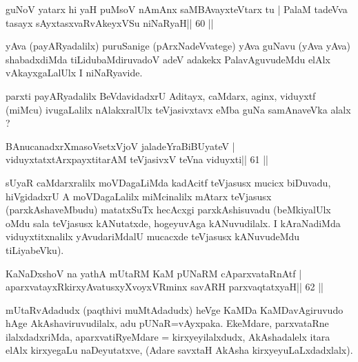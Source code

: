\begin{shl}
guNoV yatarx hi yaH puMsoV nAmAnx saMBAvayxteV\s tarx tu |
PalaM tadeVva tasayx sAyxtasxvaRvAkeyxVSu niNaRyaH\hfill || 60 ||
\end{shl}

\begin{artha}
yAva (payARyadalilx) puruSanige (pArxNadeVvatege) yAva guNavu (yAva yAva) shabadxdiMda tiLidubaMdiruvadoV adeV adakekx PalavAguvudeMdu elAlx vAkayxgaLalUlx I niNaRyavide.
\end{artha}

\begin{artha}
parxti payARyadalilx BeVdavidadxrU Aditayx, caMdarx, aginx, viduyxtf (miMcu) ivugaLalilx nAlakxralUlx teVjasivxtavx eMba guNa samAnaveVka alalx ?
\end{artha}


\begin{shl}
BAnucanadxrXmasoVsetxVjoV jaladeYraBiBUyateV |
viduyxtatxtArxpayxtitarAM teVjasivxV teVna viduyxti\hfill || 61 ||
\end{shl}

\begin{artha}
sUyaR caMdarxralilx moVDagaLiMda kadAcitf teVjasusx mucicx biDuvadu, hiVgidadxrU A moVDagaLalilx miMcinalilx mAtarx teVjasusx (parxkAshaveMbudu) matatxSuTx hecAcxgi parxkAshisuvadu (beMkiyalUlx oMdu sala teVjasusx kANutatxde, hogeyuvAga kANuvudilalx. I kAraNadiMda viduyxtitxnalilx yAvudariMdalU mucacxde teVjasusx kANuvudeMdu tiLiyabeVku).
\end{artha}



\begin{shl}
KaNaDxshoV na yathA mUtaRM KaM pUNaRM cAparxvataRnAtf |
aparxvatayxRkirxyAvatusxyXvoyxVRminx savARH parxvaqtatxyaH\hfill || 62 ||
\end{shl}

\begin{artha}
mUtaRvAdadudx (paqthivi muMtAdadudx) heVge KaMDa KaMDavAgiruvudo hAge 
AkAshaviruvudilalx, adu pUNaR=vAyxpaka. EkeMdare, parxvataRne 
ilalxdadxriMda, aparxvatiRyeMdare = kirxyeyilalxdudx, AkAshadalelx 
itara elAlx kirxyegaLu naDeyutatxve, (Adare savxtaH AkAsha 
kirxyeyuLaLxdadxlalx).
\end{artha}

